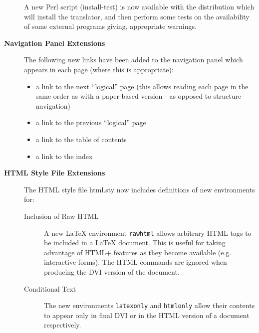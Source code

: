 \begin{description}
A new Perl script ({\fn install-test}) is now available with the distribution
which will install the translator, and then perform some tests on the
availability
of some external
programs giving, appropriate warnings.
\item[{\bf Navigation Panel Extensions}]
The following new links have been added to the navigation panel which
appears in each page
(where this is appropriate):
\begin{itemize}
\item a link to the next ``logical'' page (this allows reading each
page in the same order as with a paper-based version - as opposed to
structure navigation)
\item a link to the previous ``logical'' page 
\item a link to the table of contents
\item a link to the index 
\end{itemize}
\item[{\bf HTML Style File Extensions}]
The HTML style file {\fn html.sty} now includes definitions of new 
environments for:
\begin{description}
\item[Inclusion of Raw HTML]
A new LaTeX environment {\tt rawhtml} allows
arbitrary
HTML tags to be included in a LaTeX document. This is useful for
taking
advantage of HTML+ features as they become available (e.g. interactive
forms).
The HTML commands are ignored when producing the DVI version of the
document.
\label{sec:cond}
\item[Conditional Text]
The new environments {\tt latexonly} and {\tt htmlonly} allow their
contents to appear only in final DVI or in the HTML version of a
document respectively. 


\end{description}
\end{description}
